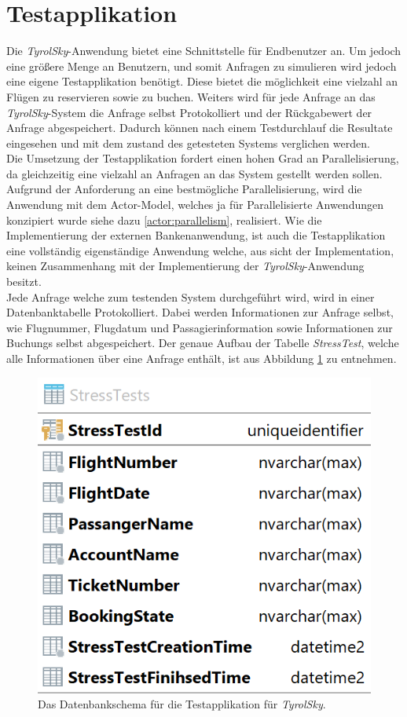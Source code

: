\section{Testapplikation}
\label{subsec:implementation:TestApplikation} 
Die \textit{TyrolSky}-Anwendung bietet eine Schnittstelle für Endbenutzer an. Um jedoch eine größere Menge an Benutzern, und somit Anfragen zu simulieren wird jedoch eine eigene Testapplikation benötigt. Diese bietet die möglichkeit eine vielzahl an Flügen zu reservieren sowie zu buchen. Weiters wird für jede Anfrage an das \textit{TyrolSky}-System die Anfrage selbst Protokolliert und der Rückgabewert der Anfrage abgespeichert. Dadurch können nach einem Testdurchlauf die Resultate eingesehen und mit dem zustand des getesteten Systems verglichen werden. \\
Die Umsetzung der Testapplikation fordert einen hohen Grad an Parallelisierung, da gleichzeitig eine vielzahl an Anfragen an das System gestellt werden sollen. Aufgrund der Anforderung an eine bestmögliche Parallelisierung, wird die Anwendung mit dem Actor-Model, welches ja für Parallelisierte Anwendungen konzipiert wurde siehe dazu \ref{actor:parallelism}, realisiert. Wie die Implementierung der externen Bankenanwendung, ist auch die Testapplikation eine vollständig eigenständige Anwendung welche, aus sicht der Implementation, keinen Zusammenhang mit der Implementierung der \textit{TyrolSky}-Anwendung besitzt. \\
Jede Anfrage welche zum testenden System durchgeführt wird, wird in einer Datenbanktabelle Protokolliert. Dabei werden Informationen zur Anfrage selbst, wie Flugnummer, Flugdatum und Passagierinformation sowie Informationen zur Buchungs selbst abgespeichert. Der genaue Aufbau der Tabelle \textit{StressTest}, welche alle Informationen über eine Anfrage enthält, ist aus Abbildung \ref{fig:implementation:stressTestDbSchema} zu entnehmen.
\begin{figure}
    \centering
    \includegraphics[width=0.4\linewidth]{gfx/implementation/stressTestDbSchema}
    \caption{Das Datenbankschema für die Testapplikation für \textit{TyrolSky}.}
    \label{fig:implementation:stressTestDbSchema}
\end{figure} 

